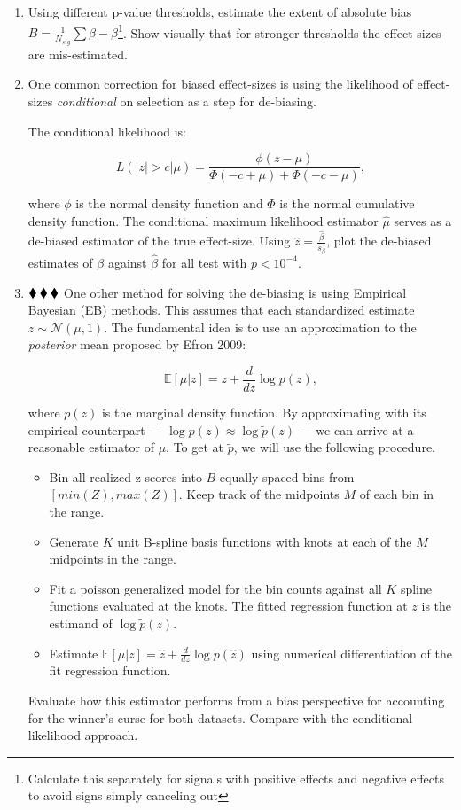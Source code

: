 \documentclass{pset}
\begin{document}
\begin{enumerate}
\item Using different p-value thresholds, estimate the extent of absolute bias $B = \frac{1}{N_{sig}} \sum \hat{\beta} - \beta$\footnote{Calculate this separately for signals with positive effects and negative effects to avoid signs simply canceling out}. Show visually that for stronger thresholds the effect-sizes are mis-estimated. 
\item One common correction for biased effect-sizes is using the likelihood of effect-sizes \textit{conditional} on selection as a step for de-biasing.

The conditional likelihood is: 

$$L(|z| > c | \mu) = \frac{\phi(z - \mu)}{\Phi(-c + \mu) + \Phi(-c - \mu)},$$

where $\phi$ is the normal density function and $\Phi$ is the normal cumulative density function. The conditional maximum likelihood estimator $\hat{\mu}$ serves as a de-biased estimator of the true effect-size. Using $\hat{z}  = \frac{\hat{\beta}}{\hat{s}_\beta}$, plot the de-biased estimates of $\beta$ against $\hat{\beta}$ for all test with $p < 10^{-4}$. 

\item $\mathbin{\blacklozenge}\mathbin{\blacklozenge}\mathbin{\blacklozenge}$ One other method for solving the de-biasing is using Empirical Bayesian (EB) methods. This assumes that each standardized estimate $z \sim \mathcal{N}(\mu, 1)$. The fundamental idea is to use an approximation to the \textit{posterior} mean proposed by Efron 2009: 

$$\mathbb{E}[\mu | z] = z + \frac{d}{dz} \log p(z),$$

where $p(z)$ is the marginal density function. By approximating with its empirical counterpart --- $\log p(z) \approx \log \tilde{p}(z)$ --- we can arrive at a reasonable estimator of $\mu$. To get at $\tilde{p}$, we will use the following procedure. 

\begin{itemize}
	\item Bin all realized z-scores into $B$ equally spaced bins from $[min(Z), max(Z)]$. Keep track of the midpoints $M$ of each bin in the range.
	\item Generate $K$ unit B-spline basis functions with knots at each of the $M$ midpoints in the range.
	\item Fit a poisson generalized model for the bin counts against all $K$ spline functions evaluated at the knots. The fitted regression function at $z$ is the estimand of $\log \tilde{p}(z)$.
	\item Estimate $\mathbb{E}[\mu | z] = \hat{z} + \frac{d}{dz} \log \tilde{p}(\hat{z})$ using numerical differentiation of the fit regression function.    
\end{itemize}

Evaluate how this estimator performs from a bias perspective for accounting for the winner's curse for both datasets. Compare with the conditional likelihood approach.   

\end{enumerate}
\end{document}
